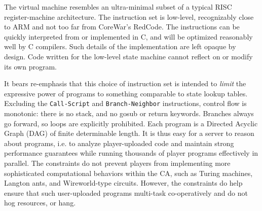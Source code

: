 \documentclass{acm_proc_article-sp}
\begin{document}
The virtual machine resembles an ultra-minimal subset of a typical RISC register-machine architecture.
The instruction set is low-level, recognizably close to ARM\cite{seal00} and not too far from CoreWar's RedCode\cite{CoreWarGuidelines84}.
The instructions can be quickly interpreted from or implemented in C, and will be optimized reasonably well by C compilers.
Such details of the implementation are left opaque by design.
Code written for the low-level state machine cannot reflect on or modify its own program.
\begin{center}
\end{center}
It bears re-emphasis that this choice of instruction set is intended to {\em limit} the expressive power of programs
to something comparable to state lookup tables.
Excluding the {\tt Call-Script} and {\tt Branch-Neighbor} instructions,
control flow is monotonic: there is no stack, and no gosub or return keywords.
Branches always go forward, so loops are explicitly prohibited.
Each program is a Directed Acyclic Graph (DAG) of finite determinable length.
It is thus easy for a server to reason about programs,
i.e. to analyze player-uploaded code and maintain strong performance guarantees
while running thousands of player programs effectively in parallel.
The constraints do not prevent players from implementing
more sophisticated computational behaviors within the CA,
such as Turing machines, Langton ants, and Wireworld-type circuits.
However, the constraints do help ensure that such user-uploaded programs
multi-task co-operatively and do not hog resources, or hang.
\end{document}
